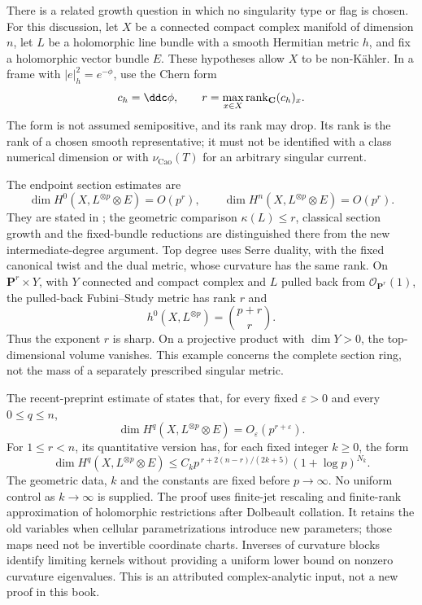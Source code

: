 There is a related growth question in which no singularity type or flag
is chosen. For this discussion, let \(X\) be a connected compact complex manifold
of dimension \(n\), let \(L\) be a holomorphic line bundle with a
smooth Hermitian metric \(h\), and fix a holomorphic vector bundle
\(E\). These hypotheses allow \(X\) to be non-K\"ahler. In a frame
with \(|e|_h^2=e^{-\phi}\), use the Chern form
\[
                  c_h=\ddc\phi,\qquad
                  r=\max_{x\in X}\operatorname{rank}_{\mathbf C}(c_h)_x.
\]
The form is not assumed semipositive, and its rank may drop.
Its rank is the rank of a chosen smooth representative; it must not
be identified with a class numerical dimension or with
\(\nu_{\mathrm{Cao}}(T)\) for an arbitrary singular current.

The endpoint section estimates are
\[
 \dim H^0(X,L^{\otimes p}\otimes E)=O(p^r),\qquad
 \dim H^n(X,L^{\otimes p}\otimes E)=O(p^r).
\]
They are stated in \cite[Theorem~A and Section~10]{Qin26CurvatureRankV1};
the geometric comparison \(\kappa(L)\leq r\), classical section growth
and the fixed-bundle reductions are distinguished there from the new
intermediate-degree argument. Top degree uses Serre duality, with the
fixed canonical twist and the dual metric, whose curvature has the same
rank. On \(\mathbf P^r\times Y\), with \(Y\) connected and compact
complex and \(L\) pulled back from \(\mathcal O_{\mathbf P^r}(1)\),
the pulled-back Fubini--Study metric has rank \(r\) and
\[
                    h^0(X,L^{\otimes p})=\binom{p+r}{r}.
\]
Thus the exponent \(r\) is sharp. On a projective product with
\(\dim Y>0\), the top-dimensional volume vanishes. This example concerns the complete section ring,
not the mass of a separately prescribed singular metric.

The recent-preprint estimate of
\cite[Theorem~A, formulas~(1.1)--(1.2)]{Qin26CurvatureRankV1}
states that, for every fixed \(\varepsilon>0\) and every
\(0\leq q\leq n\),
\[
             \dim H^q(X,L^{\otimes p}\otimes E)
                    =O_{\varepsilon}(p^{r+\varepsilon}).
\]
For \(1\leq r<n\), its quantitative version has, for each fixed
integer \(k\geq0\), the form
\[
 \dim H^q(X,L^{\otimes p}\otimes E)
 \leq C_k p^{\,r+2(n-r)/(2k+5)}(1+\log p)^{N_k}.
\]
The geometric data, \(k\) and the constants are fixed before
\(p\to\infty\). No uniform control as \(k\to\infty\) is supplied.
The proof uses finite-jet rescaling and finite-rank approximation of
holomorphic restrictions after Dolbeault collation. It retains the old
variables when cellular parametrizations introduce new parameters;
those maps need not be invertible coordinate charts. Inverses of
curvature blocks identify limiting kernels without providing a
uniform lower bound on nonzero curvature eigenvalues. This is an
attributed complex-analytic input, not a new proof in this book.

